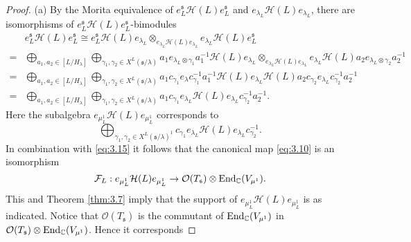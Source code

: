 \documentclass[11pt]{amsart}
\theoremstyle{definition}
\begin{document}
\begin{proof}
(a) By the Morita equivalence of $e^{{\mathfrak s}}_L {{\mathcal H}} (L) e^{{\mathfrak s}}_L$ and
$e_{\lambda_L} {{\mathcal H}} (L) e_{\lambda_L}$, there are isomorphisms of $e^{{\mathfrak s}}_L {{\mathcal H}} (L)
e^{{\mathfrak s}}_L$-bimodules
\begin{equation}\label{eq:3.18}
\begin{split}
& e^{{\mathfrak s}}_L {{\mathcal H}} (L) e^{{\mathfrak s}}_L \cong e^{{\mathfrak s}}_L {{\mathcal H}} (L) e_{\lambda_L} 
\otimes_{e_{\lambda_L} {{\mathcal H}} (L) e_{\lambda_L}} e_{\lambda_L} {{\mathcal H}} (L) e^{{\mathfrak s}}_L \\
= & \bigoplus_{a_1,a_2 \in [L / H_\lambda]} \bigoplus_{\gamma_1 ,\gamma_2 \in 
X^L ({{\mathfrak s}} / \lambda)} a_1 e_{\lambda_L \otimes \gamma_1} a_1^{-1} {{\mathcal H}} (L) 
e_{\lambda_L} \otimes_{e_{\lambda_L} {{\mathcal H}} (L) e_{\lambda_L}} 
e_{\lambda_L} {{\mathcal H}} (L) a_2 e_{\lambda_L \otimes \gamma_2} a_2^{-1} \\
= & \bigoplus_{a_1,a_2 \in [L / H_\lambda]} \bigoplus_{\gamma_1 ,\gamma_2 
\in X^L ({{\mathfrak s}} / \lambda)} a_1 c_{\gamma_1} e_\lambda c_{\gamma_1}^{-1} a_1^{-1} {{\mathcal H}} (L) 
e_{\lambda_L} {{\mathcal H}} (L) a_2 c_{\gamma_2} e_{\lambda_L} c_{\gamma_2}^{-1} a_2^{-1} \\
= & \bigoplus_{a_1,a_2 \in [L / H_\lambda]} 
\bigoplus_{\gamma_1 ,\gamma_2 \in X^L ({{\mathfrak s}} / \lambda)} 
a_1 c_{\gamma_1} e_{\lambda_L} {{\mathcal H}} (L) e_{\lambda_L} c_{\gamma_2}^{-1} a_2^{-1}.
\end{split}
\end{equation}
Here the subalgebra $e_{\mu_L^1} {{\mathcal H}} (L) e_{\mu_L^1}$ corresponds to 
\[
\bigoplus\nolimits_{\gamma_1 ,\gamma_2 \in X^L ({{\mathfrak s}} / \lambda)^1} 
c_{\gamma_1} e_{\lambda_L} {{\mathcal H}} (L) e_{\lambda_L} c_{\gamma_2}^{-1} .
\]
In combination with \eqref{eq:3.15} it follows that the canonical map 
\eqref{eq:3.10} is an isomorphism
\begin{equation}\label{eq:3.30}
\mathcal F_L : e_{\mu_L^1} {{\mathcal H}} (L) e_{\mu_L^1} \to
\mathcal O (T_{{\mathfrak s}}) \otimes {{\rm End}}_{\mathbb C} (V_{\mu^1}).
\end{equation}
This and Theorem \ref{thm:3.7} imply that the support of 
$e_{\mu_L^1} {{\mathcal H}} (L) e_{\mu_L^1}$ is as indicated.
Notice that $\mathcal O (T_{{\mathfrak s}})$ is the commutant of ${{\rm End}}_{\mathbb C} (V_{\mu^1})$
in $\mathcal O (T_{{\mathfrak s}}) \otimes {{\rm End}}_{\mathbb C} (V_{\mu^1})$. Hence it corresponds

\end{proof}
\end{document}
